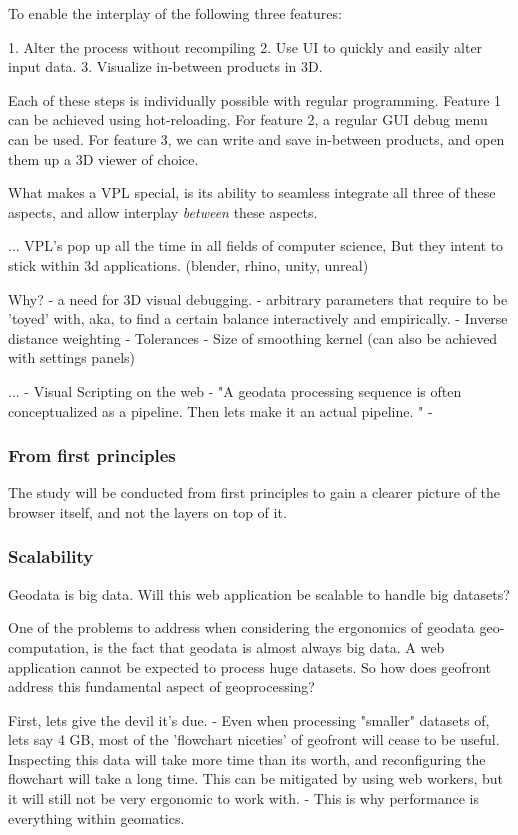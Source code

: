 To enable the interplay of the following three features: 

1. Alter the process without recompiling
2. Use UI to quickly and easily alter input data.
3. Visualize in-between products in 3D. 

Each of these steps is individually possible with regular programming. Feature 1 can be achieved using hot-reloading. For feature 2, a regular GUI debug menu can be used. For feature 3, we can write and save in-between products, and open them up a 3D viewer of choice. 

What makes a VPL special, is its ability to seamless integrate all three of these aspects, and allow interplay \emph{between} these aspects.

...
VPL's pop up all the time in all fields of computer science, But they intent to stick within 3d applications. (blender, rhino, unity, unreal)

Why? 
- a need for 3D visual debugging. 
- arbitrary parameters that require to be 'toyed' with, aka, to find a certain balance interactively and empirically.
  - Inverse distance weighting
  - Tolerances
  - Size of smoothing kernel
(can also be achieved with settings panels)

...
- Visual Scripting on the web - "A geodata processing sequence is often conceptualized as a pipeline. Then lets make it an actual pipeline. "
- 

\subsubsection*{From first principles}

The study will be conducted from first principles to gain a clearer picture of the browser itself, 
and not the layers on top of it.



\subsubsection{Scalability}

Geodata is big data. Will this web application be scalable to handle big datasets?

One of the problems to address when considering the ergonomics of geodata geo-computation, is the fact that geodata is almost always big data. A web application cannot be expected to process huge datasets. So how does geofront address this fundamental aspect of geoprocessing? 

First, lets give the devil it's due. 
- Even when processing "smaller" datasets of, lets say 4 GB, most of the 'flowchart niceties' of geofront will cease to be useful. Inspecting this data will take more time than its worth, and reconfiguring the flowchart will take a long time. This can be mitigated by using web workers, but it will still not be very ergonomic to work with. 
- This is why performance is everything within geomatics.

